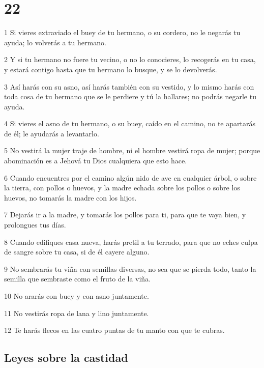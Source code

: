 \chapter{22}

\par 1 Si vieres extraviado el buey de tu hermano, o su cordero, no le negarás tu ayuda; lo volverás a tu hermano.
\par 2 Y si tu hermano no fuere tu vecino, o no lo conocieres, lo recogerás en tu casa, y estará contigo hasta que tu hermano lo busque, y se lo devolverás.
\par 3 Así harás con su asno, así harás también con su vestido, y lo mismo harás con toda cosa de tu hermano que se le perdiere y tú la hallares; no podrás negarle tu ayuda.
\par 4 Si vieres el asno de tu hermano, o su buey, caído en el camino, no te apartarás de él; le ayudarás a levantarlo. 
\par 5 No vestirá la mujer traje de hombre, ni el hombre vestirá ropa de mujer; porque abominación es a Jehová tu Dios cualquiera que esto hace.
\par 6 Cuando encuentres por el camino algún nido de ave en cualquier árbol, o sobre la tierra, con pollos o huevos, y la madre echada sobre los pollos o sobre los huevos, no tomarás la madre con los hijos.
\par 7 Dejarás ir a la madre, y tomarás los pollos para ti, para que te vaya bien, y prolongues tus días.
\par 8 Cuando edifiques casa nueva, harás pretil a tu terrado, para que no eches culpa de sangre sobre tu casa, si de él cayere alguno.
\par 9 No sembrarás tu viña con semillas diversas, no sea que se pierda todo, tanto la semilla que sembraste como el fruto de la viña.
\par 10 No ararás con buey y con asno juntamente.
\par 11 No vestirás ropa de lana y lino juntamente. 
\par 12 Te harás flecos en las cuatro puntas de tu manto con que te cubras. 

\section{Leyes sobre la castidad}

